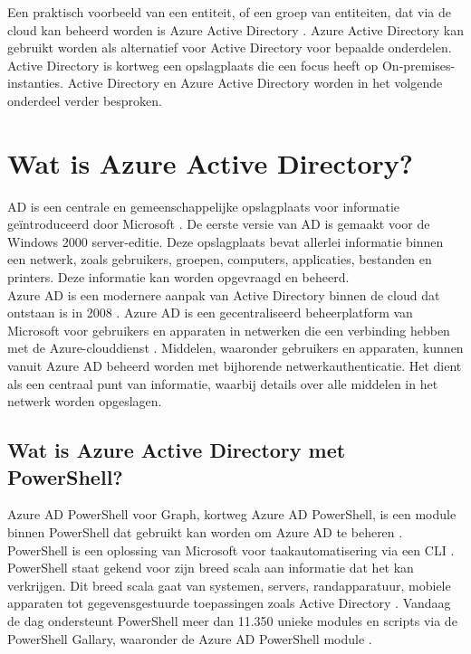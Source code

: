Een praktisch voorbeeld van een entiteit, of een groep van entiteiten, dat via de cloud kan beheerd worden is Azure Active Directory \autocite{Microsoft2023c}. Azure Active Directory kan gebruikt worden als alternatief voor Active Directory voor bepaalde onderdelen. Active Directory is kortweg een opslagplaats die een focus heeft op On-premises-instanties. Active Directory en Azure Active Directory worden in het volgende onderdeel verder besproken.


\section{Wat is Azure Active Directory?}

\ac{AD} is een centrale en gemeenschappelijke opslagplaats voor informatie geïntroduceerd door Microsoft \autocite{Allen2003}. De eerste versie van \ac{AD} is gemaakt voor de Windows 2000 server-editie. Deze opslagplaats bevat allerlei informatie binnen een netwerk, zoals gebruikers, groepen, computers, applicaties, bestanden en printers. Deze informatie kan worden opgevraagd en beheerd. \\

Azure \ac{AD} is een modernere aanpak van Active Directory binnen de cloud dat ontstaan is in 2008 \autocite{Chappell2008}. Azure \ac{AD} is een gecentraliseerd beheerplatform van Microsoft voor gebruikers en apparaten in netwerken die een verbinding hebben met de Azure-clouddienst \autocite{Mayank2019}. Middelen, waaronder gebruikers en apparaten, kunnen vanuit Azure \ac{AD} beheerd worden met bijhorende netwerkauthenticatie. Het dient als een centraal punt van informatie, waarbij details over alle middelen in het netwerk worden opgeslagen.

\subsection{Wat is Azure Active Directory met PowerShell?} 

Azure \ac{AD} PowerShell voor Graph, kortweg Azure \ac{AD} PowerShell, is een module binnen PowerShell dat gebruikt kan worden om Azure \ac{AD} te beheren \autocite{Microsoft2023}. PowerShell is een oplossing van Microsoft voor taakautomatisering via een \ac{CLI} \autocite{Microsoft2022}. \\

PowerShell staat gekend voor zijn breed scala aan informatie dat het kan verkrijgen. Dit breed scala gaat van systemen, servers, randapparatuur, mobiele apparaten tot gegevensgestuurde toepassingen zoals Active Directory \autocite{Hosmer2019}. Vandaag de dag ondersteunt PowerShell meer dan 11.350 unieke modules en scripts via de PowerShell Gallary, waaronder de Azure \ac{AD} PowerShell module \autocite{Microsoft2023a}. \\

